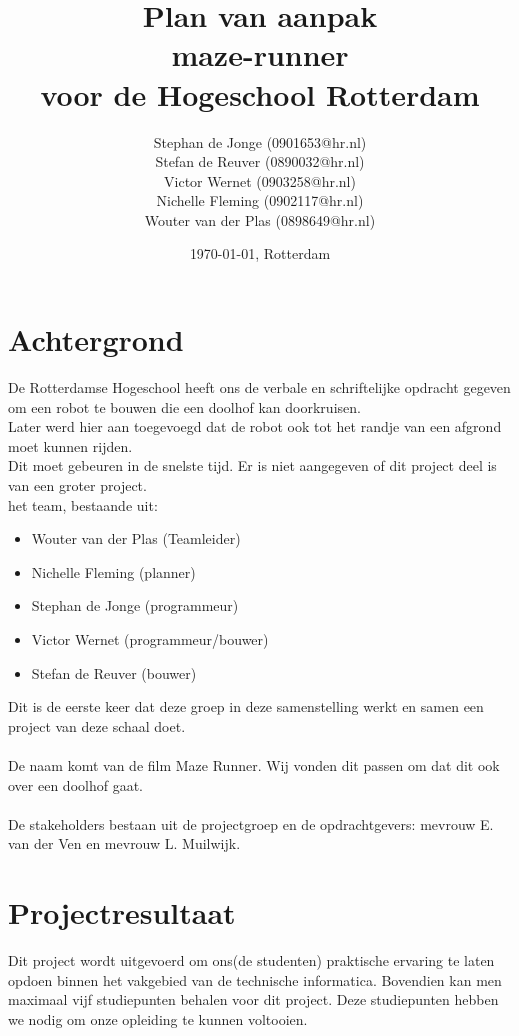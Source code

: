 \documentclass[oneside]{book}
\title{Plan van aanpak\\
maze-runner\\
\normalsize voor de Hogeschool Rotterdam
}
\author{
	Stephan de Jonge (0901653@hr.nl)\\
	Stefan de Reuver (0890032@hr.nl)\\
	Victor Wernet (0903258@hr.nl)\\
	Nichelle Fleming (0902117@hr.nl)\\
	Wouter van der Plas (0898649@hr.nl)
}
\date{\today, Rotterdam}
\begin{document}
\maketitle
\tableofcontents


\chapter{Achtergrond}

{\color{red}De Rotterdamse Hogeschool heeft ons de verbale en schriftelijke opdracht gegeven om een robot te bouwen die een doolhof kan doorkruisen.\\
Later werd hier aan toegevoegd dat de robot ook tot het randje van een afgrond moet kunnen rijden.\\
Dit moet gebeuren in de snelste tijd. Er is niet aangegeven of dit project deel is van een groter project.\\}
het team, bestaande uit:\\
\begin{itemize}
	\item Wouter van der Plas (Teamleider)
	\item Nichelle Fleming (planner)
	\item Stephan de Jonge (programmeur)
	\item Victor Wernet (programmeur/bouwer)
	\item Stefan de Reuver (bouwer)
\end{itemize}	
Dit is de eerste keer dat deze groep in deze samenstelling werkt en samen een project van deze schaal doet.\\
\\
De naam komt van de film Maze Runner. Wij vonden dit passen om dat dit ook over een doolhof gaat.\\
\\
{\color{red}De stakeholders bestaan uit de projectgroep en de opdrachtgevers: mevrouw E. van der Ven en mevrouw L. Muilwijk.}

\clearpage
\chapter{Projectresultaat}
Dit project wordt uitgevoerd om ons(de studenten) praktische ervaring te laten opdoen binnen het vakgebied van de technische informatica.
Bovendien kan men maximaal vijf studiepunten behalen voor dit project.
Deze studiepunten hebben we nodig om onze opleiding te kunnen voltooien.
\end{document}
